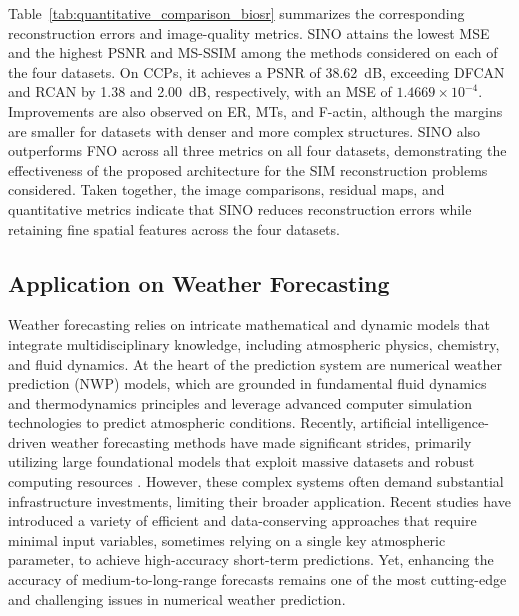 \documentclass[preprint,numbers,sort&compress]{elsarticle}
\begin{document}
			Table~\ref{tab:quantitative_comparison_biosr} summarizes the corresponding reconstruction errors and image-quality metrics. SINO attains the lowest MSE and the highest PSNR and MS-SSIM among the methods considered on each of the four datasets. On CCPs, it achieves a PSNR of 38.62~dB, exceeding DFCAN and RCAN by 1.38 and 2.00~dB, respectively, with an MSE of $1.4669\times10^{-4}$. Improvements are also observed on ER, MTs, and F-actin, although the margins are smaller for datasets with denser and more complex structures. SINO also outperforms FNO across all three metrics on all four datasets, demonstrating the effectiveness of the proposed architecture for the SIM reconstruction problems considered. Taken together, the image comparisons, residual maps, and quantitative metrics indicate that SINO reduces reconstruction errors while retaining fine spatial features across the four datasets. 
			
			
			\subsection{Application on Weather Forecasting}
			Weather forecasting relies on intricate mathematical and dynamic models that integrate multidisciplinary knowledge, including atmospheric physics, chemistry, and fluid dynamics. At the heart of the prediction system are numerical weather prediction (NWP) models, which are grounded in fundamental fluid dynamics and thermodynamics principles and leverage advanced computer simulation technologies to predict atmospheric conditions. Recently, artificial intelligence-driven weather forecasting methods have made significant strides, primarily utilizing large foundational models that exploit massive datasets and robust computing resources \cite{chen2023fuxi, bi2023accurate}. However, these complex systems often demand substantial infrastructure investments, limiting their broader application. Recent studies \cite{kurth2023fourcastnet, lin2023spherical} have introduced a variety of efficient and data-conserving approaches that require minimal input variables, sometimes relying on a single key atmospheric parameter, to achieve high-accuracy short-term predictions. Yet, enhancing the accuracy of medium-to-long-range forecasts remains one of the most cutting-edge and challenging issues in numerical weather prediction.
			
\end{document}
